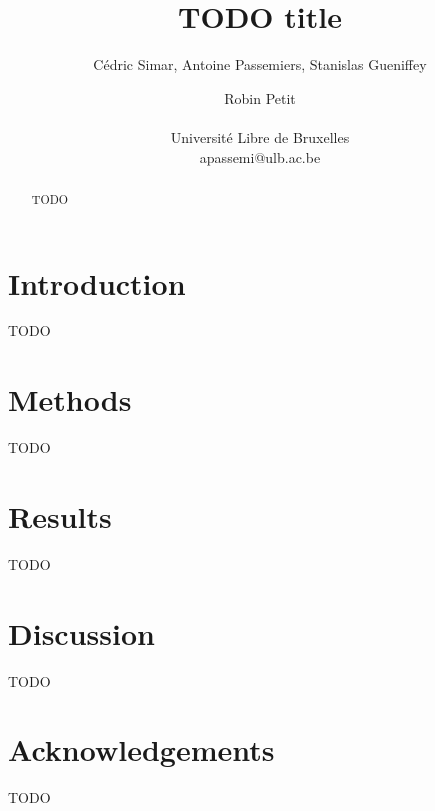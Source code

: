 \documentclass[letterpaper]{article}
\title{TODO title}
\author{Cédric Simar, Antoine Passemiers, Stanislas Gueniffey \and Robin Petit \\
\mbox{}\\
Université Libre de Bruxelles \\
apassemi@ulb.ac.be}
\begin{document}
\maketitle

\begin{abstract}
  TODO
\end{abstract}

\section{Introduction}

TODO

\section{Methods}

TODO \citep{Mnih2015}

\section{Results}

TODO

\section{Discussion}

TODO

\section{Acknowledgements}

TODO

\footnotesize


\end{document}
